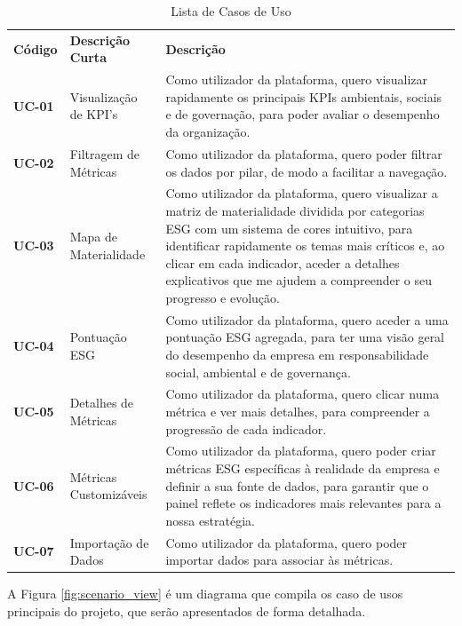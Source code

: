 \begin{table}[H]
    \renewcommand{\arraystretch}{1.2}
    \setlength{\tabcolsep}{10pt}
    \centering
    \begin{tabular}{>{\bfseries}p{1.5cm} p{3.5cm} p{8cm}}
        \rowcolor{orange!50}
        Código & \textbf{Descrição Curta} & \textbf{Descrição} \\
        UC-01 & Visualização de KPI's & Como utilizador da plataforma, quero visualizar rapidamente os principais KPIs ambientais, sociais e de governação, para poder avaliar o desempenho da organização. \\
        UC-02 & Filtragem de Métricas & Como utilizador da plataforma, quero poder filtrar os dados por pilar, de modo a facilitar a navegação. \\
        UC-03 & Mapa de Materialidade & Como utilizador da plataforma, quero visualizar a matriz de materialidade dividida por categorias ESG com um sistema de cores intuitivo, para identificar rapidamente os temas mais críticos e, ao clicar em cada indicador, aceder a detalhes explicativos que me ajudem a compreender o seu progresso e evolução. \\
        UC-04 & Pontuação ESG & Como utilizador da plataforma, quero aceder a uma pontuação ESG agregada, para ter uma visão geral do desempenho da empresa em responsabilidade social, ambiental e de governança. \\
        UC-05 & Detalhes de Métricas & Como utilizador da plataforma, quero clicar numa métrica e ver mais detalhes, para compreender a progressão de cada indicador. \\
        UC-06 & Métricas Customizáveis & Como utilizador da plataforma, quero poder criar métricas ESG específicas à realidade da empresa e definir a sua fonte de dados, para garantir que o painel reflete os indicadores mais relevantes para a nossa estratégia. \\
        UC-07 & Importação de Dados & Como utilizador da plataforma, quero poder importar dados para associar às métricas. \\      
    \end{tabular}
    \caption{Lista de Casos de Uso}
    \label{tab:use_cases}
\end{table}

A Figura \ref{fig:scenario_view} é um diagrama que compila os caso de usos principais do projeto, que serão apresentados de forma detalhada.

